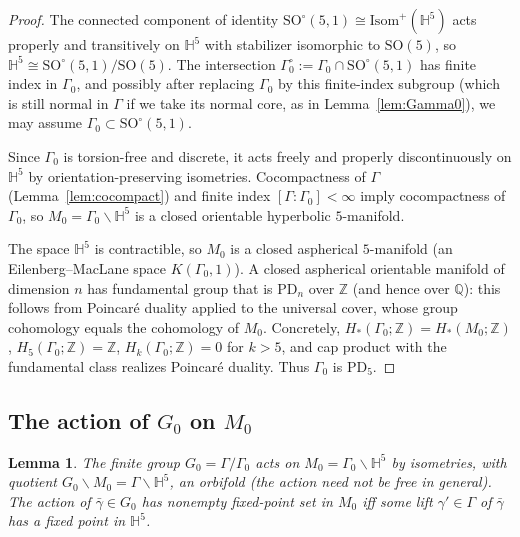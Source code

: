 \documentclass[12pt]{article}
\newtheorem{lemma}[theorem]{Lemma}
\theoremstyle{definition}
\begin{document}
\begin{proof}
The connected component of identity $\mathrm{SO}^\circ(5,1)\cong\mathrm{Isom}^+(\mathbb{H}^5)$ acts properly and transitively on $\mathbb{H}^5$ with stabilizer isomorphic to $\mathrm{SO}(5)$, so $\mathbb{H}^5\cong\mathrm{SO}^\circ(5,1)/\mathrm{SO}(5)$. The intersection $\Gamma_0^\circ:=\Gamma_0\cap\mathrm{SO}^\circ(5,1)$ has finite index in $\Gamma_0$, and possibly after replacing $\Gamma_0$ by this finite-index subgroup (which is still normal in $\Gamma$ if we take its normal core, as in Lemma~\ref{lem:Gamma0}), we may assume $\Gamma_0\subset\mathrm{SO}^\circ(5,1)$.

Since $\Gamma_0$ is torsion-free and discrete, it acts freely and properly discontinuously on $\mathbb{H}^5$ by orientation-preserving isometries. Cocompactness of $\Gamma$ (Lemma~\ref{lem:cocompact}) and finite index $[\Gamma:\Gamma_0]<\infty$ imply cocompactness of $\Gamma_0$, so $M_0=\Gamma_0\backslash\mathbb{H}^5$ is a closed orientable hyperbolic $5$-manifold.

The space $\mathbb{H}^5$ is contractible, so $M_0$ is a closed aspherical $5$-manifold (an Eilenberg--MacLane space $K(\Gamma_0,1)$). A closed aspherical orientable manifold of dimension $n$ has fundamental group that is PD$_n$ over $\mathbb{Z}$ (and hence over $\mathbb{Q}$): this follows from Poincar\'e duality applied to the universal cover, whose group cohomology equals the cohomology of $M_0$. Concretely, $H_*(\Gamma_0;\mathbb{Z})=H_*(M_0;\mathbb{Z})$, $H_5(\Gamma_0;\mathbb{Z})=\mathbb{Z}$, $H_k(\Gamma_0;\mathbb{Z})=0$ for $k>5$, and cap product with the fundamental class realizes Poincar\'e duality. Thus $\Gamma_0$ is PD$_5$.
\end{proof}

\subsection{The action of $G_0$ on $M_0$}

\begin{lemma}\label{lem:G0action}
The finite group $G_0=\Gamma/\Gamma_0$ acts on $M_0=\Gamma_0\backslash\mathbb{H}^5$ by isometries, with quotient $G_0\backslash M_0 = \Gamma\backslash\mathbb{H}^5$, an orbifold (the action need not be free in general). The action of $\bar\gamma\in G_0$ has nonempty fixed-point set in $M_0$ iff some lift $\gamma'\in\Gamma$ of $\bar\gamma$ has a fixed point in $\mathbb{H}^5$.
\end{lemma}
\end{document}
